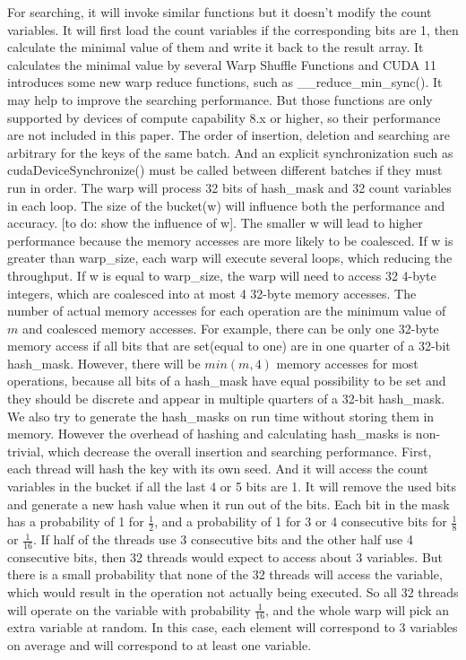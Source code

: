 \documentclass[conference]{IEEEtran}
\begin{document}
For searching, it will invoke similar functions but it doesn't modify the count variables. It will first load the count variables if the corresponding bits are 1, then calculate the minimal value of them and write it back to the result array. It calculates the minimal value by several Warp Shuffle Functions and CUDA 11 introduces some new warp reduce functions, such as \_\_reduce\_min\_sync(). It may help to improve the searching performance. But those functions are only supported by devices of compute capability 8.x or higher, so their performance are not included in this paper.
The order of insertion, deletion and searching are arbitrary for the keys of the same batch. And an explicit synchronization such as cudaDeviceSynchronize() must be called between different batches if they must run in order. 
The warp will process 32 bits of hash\_mask and 32 count variables in each loop. The size of the bucket(w) will influence both the performance and accuracy. [to do: show the influence of w]. The smaller w will lead to higher performance because the memory accesses are more likely to be coalesced. If w is greater than warp\_size, each warp will execute several loops, which reducing the throughput. If w is equal to warp\_size, the warp will need to access 32 4-byte integers, which are coalesced into at most 4 32-byte memory accesses. The number of actual memory accesses for each operation are the minimum value of $m$ and coalesced memory accesses. For example, there can be only one 32-byte memory access if all bits that are set(equal to one) are in one quarter of a 32-bit hash\_mask. However, there will be $min(m, 4)$ memory accesses for most operations, because all bits of a hash\_mask have equal possibility to be set and they should be discrete and appear in multiple quarters of a 32-bit hash\_mask.
We also try to generate the hash\_masks on run time without storing them in memory. However the overhead of hashing and calculating hash\_masks is non-trivial, which decrease the overall insertion and searching performance. First, each thread will hash the key with its own seed. And it will access the count variables in the bucket if all the last 4 or 5 bits are 1. It will remove the used bits and generate a new hash value when it run out of the bits.
Each bit in the mask has a probability of 1 for $\frac{1}{2}$, and a probability of 1 for 3 or 4 consecutive bits for $\frac{1}{8}$ or $\frac{1}{16}$. If half of the threads use 3 consecutive bits and the other half use 4 consecutive bits, then 32 threads would expect to access about 3 variables. But there is a small probability that none of the 32 threads will access the variable, which would result in the operation not actually being executed. So all 32 threads will operate on the variable with probability $\frac{1}{16}$, and the whole warp will pick an extra variable at random. In this case, each element will correspond to 3 variables on average and will correspond to at least one variable. 
\end{document}
